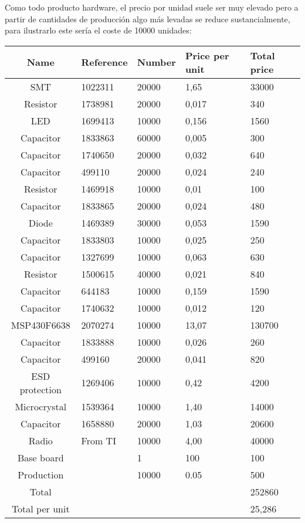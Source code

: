 	Como todo producto hardware, el precio por unidad suele ser muy elevado pero a partir de cantidades de producción algo más levadas se reduce sustancialmente, para 
	ilustrarlo este sería el coste de 10000 unidades:\\

\begin{tabular}{| c |l | l | l | l |} 
	\hline
		Name & Reference & Number & Price per unit & Total price\\ \hline
		SMT & 1022311 & 20000 & 1,65 & 33000\\ \hline
		Resistor & 1738981 & 20000 & 0,017 & 340\\ \hline
		LED & 1699413 & 10000 & 0,156 & 1560\\ \hline
		Capacitor & 1833863 & 60000 & 0,005 & 300\\ \hline
		Capacitor & 1740650 & 20000 & 0,032 & 640\\ \hline
		Capacitor & 499110 & 20000 & 0,024 & 240\\ \hline
		Resistor & 1469918 & 10000 & 0,01 & 100\\ \hline
		Capacitor & 1833865 & 20000 & 0,024  & 480\\ \hline
		Diode & 1469389 & 30000 & 0,053 & 1590\\ \hline
	   	Capacitor & 1833803 & 10000 & 0,025 & 250\\ \hline
 		Capacitor & 1327699 & 10000 & 0,063 & 630 \\ \hline
  		Resistor & 1500615 & 40000 & 0,021 & 840\\ \hline
	 	Capacitor & 644183 & 10000 & 0,159 & 1590 \\ \hline
	 	Capacitor & 1740632 & 10000 & 0,012  & 120\\ \hline
	 	MSP430F6638 & 2070274 & 10000 & 13,07 & 130700\\ \hline
	 	Capacitor & 1833888 & 10000 & 0,026  & 260\\ \hline
	 	Capacitor & 499160 & 20000 & 0,041  & 820\\ \hline
	 	ESD protection & 1269406 & 10000 & 0,42  & 4200\\ \hline
	 	Microcrystal & 1539364 & 10000 & 1,40 & 14000\\ \hline
	 	Capacitor & 1658880 & 20000 & 1,03  & 20600\\ \hline
	 	Radio & From TI & 10000 & 4,00 & 40000\\ \hline
		Base board &  & 1 & 100 & 100\\ \hline
		Production &  & 10000 & 0.05 & 500\\ \hline
	 	Total &  &  &  & 252860\\ \hline
	 	Total per unit &  &  &  & 25,286\\ \hline
	\hline
\end{tabular}\\\\











